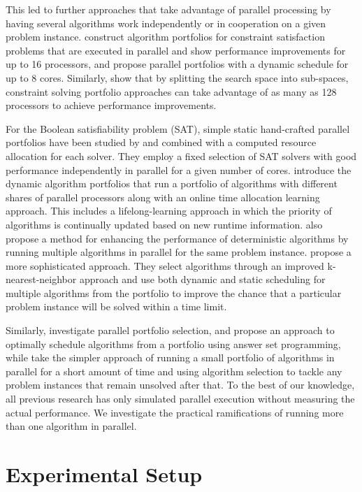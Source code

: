 This led to further approaches that take advantage of parallel processing by having several algorithms work independently or in cooperation on a given problem instance. \cite{Yun} construct algorithm portfolios for constraint satisfaction problems that are executed in parallel and show performance improvements for up to 16 processors, and \cite{sunnycp2} propose parallel portfolios with a dynamic schedule for up to 8 cores. Similarly, \cite{10.5555/1661445.1661516} show that by splitting the search space into sub-spaces, constraint solving portfolio approaches can take advantage of as many as 128 processors to achieve performance improvements.

For the Boolean satisfiability problem (SAT), simple static hand-crafted
parallel portfolios have been studied by \cite{roussel2012} and
\cite{wotzlawpfoliouzk} combined with a computed resource allocation for each solver. They employ a fixed selection of SAT solvers with good performance independently in parallel for a given number of cores.
\cite{gagliolo2006dynamic} introduce the dynamic algorithm portfolios that run a portfolio of algorithms with different shares of parallel processors along with an online time allocation learning approach. This includes a lifelong-learning approach in which the priority of algorithms is continually updated based on new runtime information.
\cite{petrik2006learning} also propose a method for enhancing
the performance of deterministic algorithms by running multiple algorithms in parallel for the same problem instance.  \cite{3s,Malitsky2012} propose a more sophisticated approach. They select algorithms through an improved k-nearest-neighbor approach and use both dynamic and static scheduling for multiple algorithms from the portfolio to improve the chance that a particular problem instance will be solved within a time limit.

Similarly, \cite{Marius2015} investigate parallel portfolio selection, and
\cite{aspeed} propose an approach to optimally schedule algorithms from a portfolio using answer set programming, while \cite{Gonard2019} take the simpler approach of running a small portfolio of algorithms in parallel for a short amount of time and using algorithm selection to tackle any problem instances that remain unsolved after that. To the best of our knowledge, all previous research has only simulated parallel execution without measuring the actual performance. We investigate the practical ramifications of running more than one algorithm in parallel.

\section{Experimental Setup}

